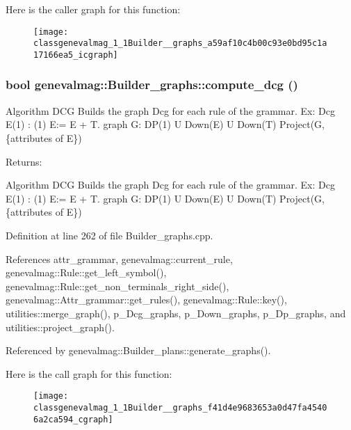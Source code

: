 Here is the caller graph for this function:\nopagebreak
\begin{figure}[H]
\begin{center}
\leavevmode
\texttt{[image: classgenevalmag\_1\_1Builder\_\_graphs\_a59af10c4b00c93e0bd95c1a17166ea5\_icgraph]}
\end{center}
\end{figure}
\hypertarget{classgenevalmag_1_1Builder__graphs_f41d4e9683653a0d47fa45406a2ca594}{
\subsubsection[{compute\_\-dcg}]{\setlength{\rightskip}{0pt plus 5cm}bool genevalmag::Builder\_\-graphs::compute\_\-dcg ()}}
\label{classgenevalmag_1_1Builder__graphs_f41d4e9683653a0d47fa45406a2ca594}


Algorithm DCG Builds the graph Dcg for each rule of the grammar. Ex: Dcg E(1) : (1) E:= E + T. graph G: DP(1) U Down(E) U Down(T) Project(G,\{attributes of E\}) \begin{Desc}
\item[Returns:]\end{Desc}
Algorithm DCG Builds the graph Dcg for each rule of the grammar. Ex: Dcg E(1) : (1) E:= E + T. graph G: DP(1) U Down(E) U Down(T) Project(G,\{attributes of E\}) 

Definition at line 262 of file Builder\_\-graphs.cpp.

References attr\_\-grammar, genevalmag::current\_\-rule, genevalmag::Rule::get\_\-left\_\-symbol(), genevalmag::Rule::get\_\-non\_\-terminals\_\-right\_\-side(), genevalmag::Attr\_\-grammar::get\_\-rules(), genevalmag::Rule::key(), utilities::merge\_\-graph(), p\_\-Dcg\_\-graphs, p\_\-Down\_\-graphs, p\_\-Dp\_\-graphs, and utilities::project\_\-graph().

Referenced by genevalmag::Builder\_\-plans::generate\_\-graphs().

Here is the call graph for this function:\nopagebreak
\begin{figure}[H]
\begin{center}
\leavevmode
\texttt{[image: classgenevalmag\_1\_1Builder\_\_graphs\_f41d4e9683653a0d47fa45406a2ca594\_cgraph]}
\end{center}
\end{figure}


